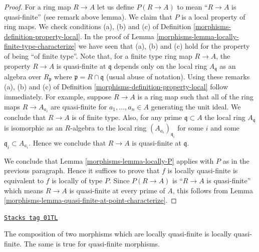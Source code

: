 \begin{proof}

For a ring map $R \to A$ let us define
$P(R \to A)$ to mean ``$R \to A$ is quasi-finite''
(see remark above lemma).
We claim that $P$ is a local property of ring maps.
We check conditions (a), (b) and (c) of Definition
\ref{morphisms-definition-property-local}. In the proof of
Lemma \ref{morphisms-lemma-locally-finite-type-characterize}
we have seen that (a), (b) and (c) hold for the property
of being ``of finite type''. Note that, for a finite type ring map
$R \to A$, the property $R \to A$ is quasi-finite at $\mathfrak q$
depends only on the local ring $A_{\mathfrak q}$ as an
algebra over $R_{\mathfrak p}$ where $\mathfrak p = R \cap \mathfrak q$
(usual abuse of notation). Using these remarks (a), (b) and (c) of
Definition \ref{morphisms-definition-property-local} follow immediately.
For example, suppose $R \to A$ is a ring map
such that all of the ring maps $R \to A_{a_i}$ are quasi-finite
for $a_1, \ldots, a_n \in A$ generating the unit ideal.
We conclude that $R \to A$ is of finite type. Also, for any
prime $\mathfrak q \subset A$ the local ring $A_{\mathfrak q}$
is isomorphic as an $R$-algebra to the local ring
$(A_{a_i})_{\mathfrak q_i}$ for some $i$ and some
$\mathfrak q_i \subset A_{a_i}$. Hence we conclude that
$R \to A$ is quasi-finite at $\mathfrak q$.

\medskip\noindent
We conclude that Lemma \ref{morphisms-lemma-locally-P} applies with $P$
as in the previous paragraph.
Hence it suffices to prove that $f$ is locally quasi-finite is
equivalent to $f$ is locally of type $P$. Since $P(R \to A)$
is ``$R \to A$ is quasi-finite'' which means $R \to A$ is
quasi-finite at every prime of $A$, this follows from
Lemma \ref{morphisms-lemma-quasi-finite-at-point-characterize}.
\end{proof}

\begin{lemma}
\label{morphisms-lemma-composition-quasi-finite}
\href{https://stacks.math.columbia.edu/tag/01TL}{\texttt{Stacks tag 01TL}}

The composition of two morphisms which are locally quasi-finite is
locally quasi-finite. The same is true for quasi-finite morphisms.
\end{lemma}


